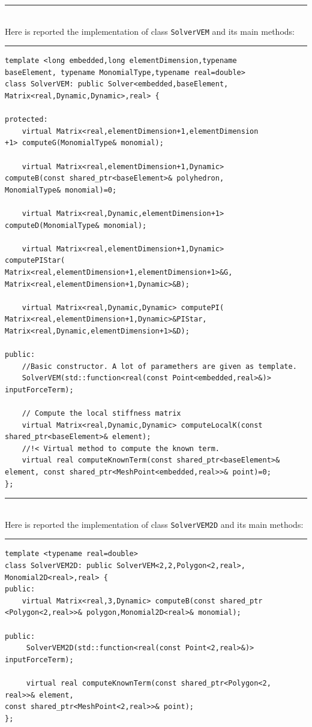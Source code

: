 \noindent\rule{16cm}{1pt}\\

Here is reported the implementation of class \verb|SolverVEM| and its main methods:

\noindent\rule{16cm}{1pt}
\begin{lstlisting}[caption=File \texttt{SolverVEM.h}]
template <long embedded,long elementDimension,typename 
baseElement, typename MonomialType,typename real=double>
class SolverVEM: public Solver<embedded,baseElement,
Matrix<real,Dynamic,Dynamic>,real> {

protected:
    virtual Matrix<real,elementDimension+1,elementDimension
+1> computeG(MonomialType& monomial);

    virtual Matrix<real,elementDimension+1,Dynamic> 
computeB(const shared_ptr<baseElement>& polyhedron,
MonomialType& monomial)=0;

    virtual Matrix<real,Dynamic,elementDimension+1> 
computeD(MonomialType& monomial);
	
    virtual Matrix<real,elementDimension+1,Dynamic> 
computePIStar(
Matrix<real,elementDimension+1,elementDimension+1>&G,
Matrix<real,elementDimension+1,Dynamic>&B);

    virtual Matrix<real,Dynamic,Dynamic> computePI(
Matrix<real,elementDimension+1,Dynamic>&PIStar,
Matrix<real,Dynamic,elementDimension+1>&D);
	
public:
    //Basic constructor. A lot of paramethers are given as template.
    SolverVEM(std::function<real(const Point<embedded,real>&)>
inputForceTerm);
	
    // Compute the local stiffness matrix
    virtual Matrix<real,Dynamic,Dynamic> computeLocalK(const
shared_ptr<baseElement>& element); 
    //!< Virtual method to compute the known term.
    virtual real computeKnownTerm(const shared_ptr<baseElement>& 
element, const shared_ptr<MeshPoint<embedded,real>>& point)=0; 
};
\end{lstlisting}

\noindent\rule{16cm}{1pt}\\

Here is reported the implementation of class \verb|SolverVEM2D| and its main methods:

\noindent\rule{16cm}{1pt}
\begin{lstlisting}[caption=File \texttt{SolverVEM2D.h}]
template <typename real=double>
class SolverVEM2D: public SolverVEM<2,2,Polygon<2,real>,
Monomial2D<real>,real> {
public:
    virtual Matrix<real,3,Dynamic> computeB(const shared_ptr
<Polygon<2,real>>& polygon,Monomial2D<real>& monomial);

public:
     SolverVEM2D(std::function<real(const Point<2,real>&)> 
inputForceTerm);
    
     virtual real computeKnownTerm(const shared_ptr<Polygon<2,
real>>& element,
const shared_ptr<MeshPoint<2,real>>& point);
};
\end{lstlisting}

